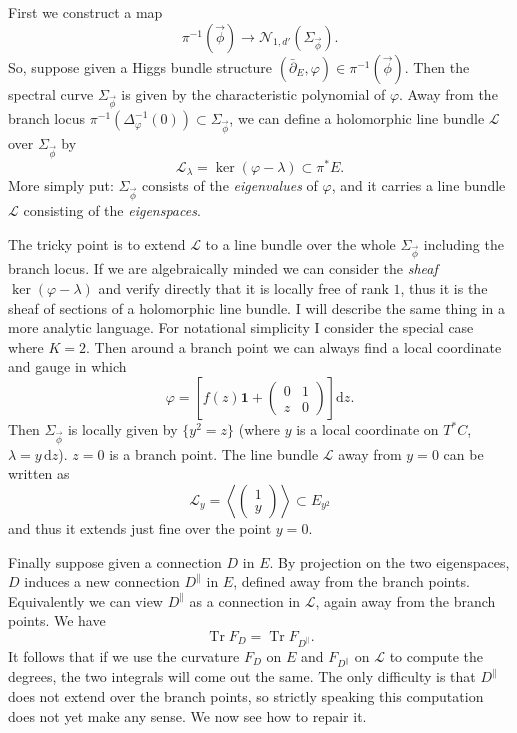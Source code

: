 \documentclass[12pt,letterpaper,reqno]{article}
\numberwithin{equation}{section}
\newcommand{\cL}{\ensuremath{\mathcal L}}
\newcommand{\cN}{\ensuremath{\mathcal N}}
\newcommand\bid{{\mathbf 1}}
\newcommand{\de}{\mathrm{d}}
\newcommand{\ti}[1]{\textit{#1}}
\DeclareMathOperator{\Tr}{Tr}
\begin{document}
\begin{pf} First we construct a map 
\begin{equation}
  \pi^{-1}(\vec\phi) \to \cN_{1,d'}(\Sigma_{\vec\phi}).
\end{equation}
So, suppose given a Higgs bundle structure
$(\bar\partial_E,\varphi) \in \pi^{-1}(\vec\phi)$. 
Then the spectral
curve $\Sigma_{\vec\phi}$ is given by the characteristic polynomial
of $\varphi$. Away from the branch locus
 $\pi^{-1}(\Delta_\varphi^{-1}(0)) \subset \Sigma_{\vec\phi}$, we can
define a holomorphic line bundle $\cL$ over $\Sigma_{\vec\phi}$ by
\begin{equation}
 \cL_\lambda = \ker(\varphi - \lambda) \subset \pi^* E. 
\end{equation}
More simply put: 
$\Sigma_{\vec\phi}$ consists of the \ti{eigenvalues} of $\varphi$,
and it carries a line bundle $\cL$ consisting of the \ti{eigenspaces}.

The tricky point is to extend
$\cL$ to a line bundle over the whole $\Sigma_{\vec\phi}$ 
including the branch locus.
If we are algebraically minded we can consider the
\ti{sheaf} $\ker(\varphi-\lambda)$ and verify directly that it is
locally free of rank $1$, thus it is the sheaf of sections of a
holomorphic line bundle. I will describe the same thing in a more 
analytic language. For notational simplicity I consider the special case
where $K=2$. Then around a branch point 
we can always find a local coordinate and gauge in which
\begin{equation}
   \varphi = \left[f(z) \bid + \begin{pmatrix} 0 & 1 \\ z & 0 \end{pmatrix}\right] \de z.
\end{equation}
Then $\Sigma_{\vec\phi}$ is locally
given by $\{y^2 = z\}$ (where $y$ is a local coordinate on $T^*C$, $\lambda = y \, \de z$). $z = 0$ is a branch point.
The line bundle $\cL$ away from $y=0$ can be written as
\begin{equation}
  \cL_y = \left\langle   \begin{pmatrix} 1 \\ y  \end{pmatrix}
\right\rangle  \subset E_{y^2}
\end{equation}
and thus it extends just fine over the point $y=0$.

Finally suppose given a connection $D$ in $E$.
By projection on the two eigenspaces, $D$ induces a new
connection $D^\parallel$ in $E$, defined away from the branch points.
Equivalently we can view $D^\parallel$ as a connection in $\cL$,
again away from the branch points. We have
\begin{equation}
  \Tr F_D = \Tr F_{D^\parallel}.
\end{equation}
It follows that if we use the curvature $F_D$ on $E$
and $F_{D^\parallel}$ on $\cL$ to compute 
the degrees, the two integrals will come out the same.
The only difficulty is that $D^\parallel$ does not extend 
over the branch points, so strictly speaking this 
computation does not yet make any sense. We now see how
to repair it.


\end{pf}
\end{document}
